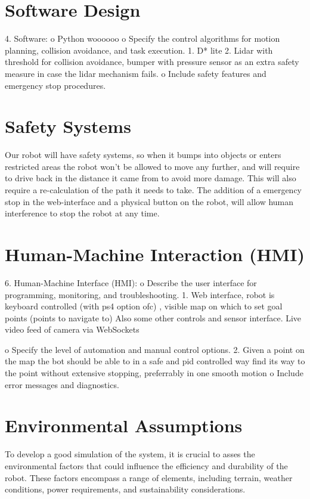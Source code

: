\documentclass[a4paper]{article}
\begin{document}
\section*{Software Design}
4.	Software:
o	Python woooooo
o	Specify the control algorithms for motion planning, collision avoidance, and task execution.
1.	D* lite
2.	Lidar with threshold for collision avoidance, bumper with pressure sensor as an extra safety measure in case the lidar mechanism fails.
o	Include safety features and emergency stop procedures.

\section*{Safety Systems}
Our robot will have safety systems, so when it bumps into objects or enters restricted areas the robot won't be allowed to move any further, and will require to drive back in the distance it came from to avoid more damage. This will also require a re-calculation of the path it needs to take. The addition of a emergency stop in the web-interface and a physical button on the robot, will allow human interference to stop the robot at any time.

\section*{Human-Machine Interaction (HMI)}
6.	Human-Machine Interface (HMI):
o	Describe the user interface for programming, monitoring, and troubleshooting.
1. Web interface, robot is keyboard controlled (with ps4 option ofc) , 		visible map on which to set goal points (points to navigate to)
Also some other controls and sensor interface. Live video feed of 		camera via WebSockets 	

o	Specify the level of automation and manual control options.
2. Given a point on the map the bot should be able to in a safe and pid controlled way find its way to the point without extensive stopping, preferrably in one smooth motion
o	Include error messages and diagnostics.

\section*{Environmental Assumptions}
To develop a good simulation of the system, it is crucial to asses the environmental factors that could influence the efficiency and durability of the robot. These factors encompass a range of elements, including terrain, weather conditions, power requirements, and sustainability considerations.
\end{document}
